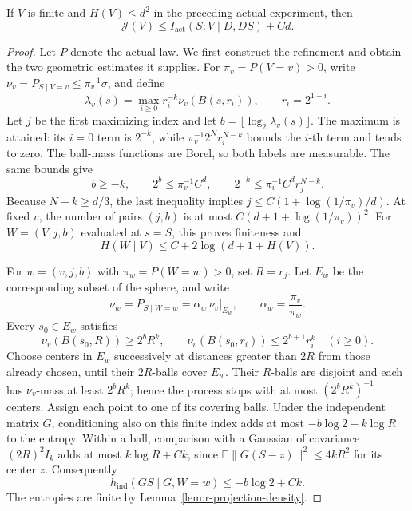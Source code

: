 \begin{proposition}
\label{rlevels:two-comparison}
If \(V\) is finite and \(H(V)\le d^2\) in the preceding actual
experiment, then
\begin{equation}\label{rlevels:two-comparison-bound}
 \mathcal J(V)\le I_{\mathrm{act}}(S;V\mid D,DS)+Cd.
\end{equation}
\end{proposition}

\begin{proof}
Let \(P\) denote the actual law.  We first construct the refinement and obtain the two geometric
estimates it supplies.  For \(\pi_v=P(V=v)>0\), write
\(\nu_v=P_{S\mid V=v}\le\pi_v^{-1}\sigma\), and define
\[
 \lambda_v(s)=\max_{i\ge0} r_i^{-k}\nu_v(B(s,r_i)),
 \qquad r_i=2^{1-i}.
\]
Let \(j\) be the first maximizing index and let
\(b=\lfloor\log_2\lambda_v(s)\rfloor\).  The maximum is attained:
its \(i=0\) term is \(2^{-k}\), while
\(\pi_v^{-1}2^N r_i^{N-k}\) bounds the \(i\)-th term and tends
to zero.  The ball-mass functions are Borel, so both labels are
measurable.  The same bounds give
\[
 b\ge-k,\qquad 2^b\le\pi_v^{-1}C^d,\qquad
 2^{-k}\le\pi_v^{-1}C^d r_j^{N-k}.
\]
Because \(N-k\ge d/3\), the last inequality implies
\(j\le C(1+\log(1/\pi_v)/d)\).  At fixed \(v\), the number of
pairs \((j,b)\) is at most \(C(d+1+\log(1/\pi_v))^2\).
For \(W=(V,j,b)\) evaluated at \(s=S\), this proves finiteness and
\begin{equation}\label{rlevels:two-label-entropy}
 H(W\mid V)\le C+2\log(d+1+H(V)).
\end{equation}

For \(w=(v,j,b)\) with \(\pi_w=P(W=w)>0\), set \(R=r_j\).
Let \(E_w\) be the corresponding subset of the sphere, and write
\[
 \nu_w=P_{S\mid W=w}
       =\alpha_w\,\nu_v|_{E_w},\qquad
 \alpha_w=\frac{\pi_v}{\pi_w}.
\]
Every \(s_0\in E_w\) satisfies
\[
 \nu_v(B(s_0,R))\ge2^bR^k,\qquad
 \nu_v(B(s_0,r_i))\le2^{b+1}r_i^k\quad(i\ge0).
\]
Choose centers in \(E_w\) successively at distances greater than
\(2R\) from those already chosen, until their \(2R\)-balls cover
\(E_w\).  Their \(R\)-balls are disjoint and each has
\(\nu_v\)-mass at least \(2^bR^k\); hence the process stops with
at most \((2^bR^k)^{-1}\) centers.  Assign each point to one of
its covering balls.  Under the independent matrix \(G\), conditioning
also on this finite index adds at most
\(-b\log2-k\log R\) to the entropy.  Within a ball, comparison with
a Gaussian of covariance \((2R)^2I_k\) adds at most
\(k\log R+Ck\), since
\(\mathbb E\|G(S-z)\|^2\le4kR^2\) for its center \(z\).
Consequently
\begin{equation}\label{rlevels:two-independent-entropy}
 h_{\mathrm{ind}}(GS\mid G,W=w)\le-b\log2+Ck.
\end{equation}
The entropies are finite by Lemma~\ref{lem:r-projection-density}.


\end{proof}
